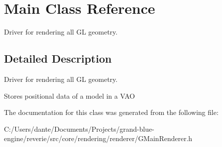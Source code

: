 \hypertarget{class_main}{}\section{Main Class Reference}
\label{class_main}


Driver for rendering all GL geometry.  




\subsection{Detailed Description}
Driver for rendering all GL geometry. 

Stores positional data of a model in a V\+AO 

The documentation for this class was generated from the following file\+:\begin{DoxyCompactItemize}
\item 
C\+:/\+Users/dante/\+Documents/\+Projects/grand-\/blue-\/engine/reverie/src/core/rendering/renderer/G\+Main\+Renderer.\+h\end{DoxyCompactItemize}
